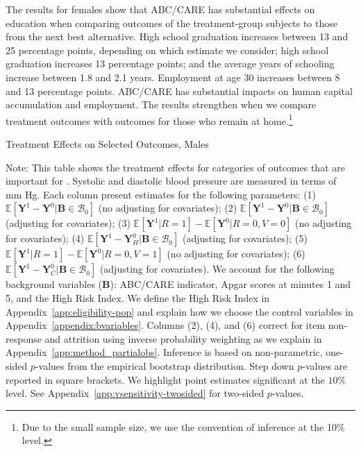 The results for females show that ABC/CARE has substantial effects on education when comparing outcomes of the treatment-group subjects to those from the next best alternative. High school graduation increases between 13 and 25 percentage points, depending on which estimate we consider; high school graduation increases 13 percentage points; and the average years of schooling increase between 1.8 and 2.1 years. Employment at age 30 increases between 8 and 13 percentage points. ABC/CARE has substantial impacts on human capital accumulation and employment. The results strengthen when we compare treatment outcomes with outcomes for those who remain at home.\footnote{Due to the small sample size, we use the convention of inference at the 10\% level.}

\begin{table}
\centering
\begin{threeparttable}
\caption{Treatment Effects on Selected Outcomes, Males}\label{table:tescombinedmales}
\begin{scriptsize}

\end{scriptsize}
\begin{tablenotes}
\scriptsize
Note: This table shows the treatment effects for categories of outcomes that are important for \citet{Garcia_Heckman_Leaf_etal_2017_Comp_CBA_Unpublished}. Systolic and diastolic blood pressure are measured in terms of mm Hg. Each column present estimates for the following parameters: (1) $\mathbb{E} \left [ \bm{Y}^1 -  \bm{Y}^0 | \bm{B} \in \mathcal{B}_{0} \right]$ (no adjusting for covariates); (2) $\mathbb{E} \left [ \bm{Y}^1 -  \bm{Y}^0 | \bm{B} \in \mathcal{B}_{0} \right]$ (adjusting for covariates); (3) $\mathbb{E} \left [ \bm{Y}^1 | R = 1 \right] -  \mathbb{E} \left [ \bm{Y}^0 | R = 0,V = 0  \right]$ (no adjusting for covariates); (4) $\mathbb{E} \left [ \bm{Y}^1 -  \bm{Y}_H^0 | \bm{B} \in \mathcal{B}_{0} \right]$ (adjusting for covariates); (5) $\mathbb{E} \left [ \bm{Y}^1 | R = 1 \right] -  \mathbb{E} \left [ \bm{Y}^0 | R = 0,V = 1 \right]$ (no adjusting for covariates); (6) $\mathbb{E} \left [ \bm{Y}^1 -  \bm{Y}_C^0 | \bm{B} \in \mathcal{B}_{0} \right]$ (adjusting for covariates). We account for the following background variables ($\bm{B}$): ABC/CARE indicator, Apgar scores at minutes 1 and 5, and the High Risk Index. We define the High Risk Index in Appendix~\ref{app:eligibility-pop} and explain how we choose the control variables in Appendix~\ref{appendix:bvariables}. Columns (2), (4), and (6) correct for item non-response and attrition using inverse probability weighting as we explain in Appendix~\ref{app:method_partialobs}. Inference is based on non-parametric, one-sided $p$-values from the empirical bootstrap distribution. Step down $p$-values are reported in square brackets. We highlight point estimates significant at the $10\%$ level. See Appendix~\ref{app:vsensitivity-twosided} for two-sided $p$-values.\\
\end{tablenotes}
\end{threeparttable}
\end{table}
\doublespacing

